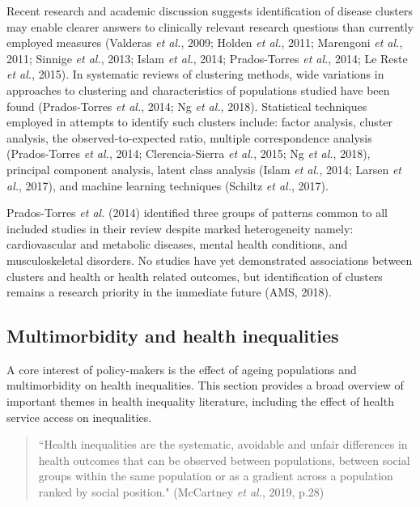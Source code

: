 \documentclass[12pt,a4paper,oneside,table]{report}
\begin{document}
Recent research and academic discussion suggests identification of
disease clusters may enable clearer answers to clinically relevant
research questions than currently employed measures (Valderas \emph{et
al.}, 2009; Holden \emph{et al.}, 2011; Marengoni \emph{et al.}, 2011;
Sinnige \emph{et al.}, 2013; Islam \emph{et al.}, 2014; Prados-Torres
\emph{et al.}, 2014; Le Reste \emph{et al.}, 2015). In systematic
reviews of clustering methods, wide variations in approaches to
clustering and characteristics of populations studied have been found
(Prados-Torres \emph{et al.}, 2014; Ng \emph{et al.}, 2018). Statistical
techniques employed in attempts to identify such clusters include:
factor analysis, cluster analysis, the observed-to-expected ratio,
multiple correspondence analysis (Prados-Torres \emph{et al.}, 2014;
Clerencia-Sierra \emph{et al.}, 2015; Ng \emph{et al.}, 2018), principal
component analysis, latent class analysis (Islam \emph{et al.}, 2014;
Larsen \emph{et al.}, 2017), and machine learning techniques (Schiltz
\emph{et al.}, 2017).

Prados-Torres \textit{et al.} (2014) identified three groups of patterns
common to all included studies in their review despite marked
heterogeneity namely: cardiovascular and metabolic diseases, mental
health conditions, and musculoskeletal disorders. No studies have yet
demonstrated associations between clusters and health or health related
outcomes, but identification of clusters remains a research priority in
the immediate future (AMS, 2018).

\subsection{Multimorbidity and health inequalities}\label{subsec:mm-hi}

A core interest of policy-makers is the effect of ageing populations and
multimorbidity on health inequalities. This section provides a broad
overview of important themes in health inequality literature, including
the effect of health service access on inequalities.

\begin{quotation} ``Health inequalities are the systematic, avoidable and unfair differences in health outcomes that can be observed between populations, between social groups within the same population or as a gradient across a population ranked by social position." \hfill (McCartney \emph{et al.}, 2019, p.28) \end{quotation}
\end{document}

